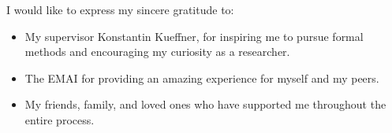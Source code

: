 
\begin{acknowledgement}


I would like to express my sincere gratitude to:

\begin{itemize}
 \item My supervisor Konstantin Kueffner, for inspiring me to pursue formal methods and encouraging my curiosity as a researcher. 
 \vspace*{3mm}
 \item The EMAI for providing an amazing experience for myself and my peers.
 \vspace*{3mm}
 \item My friends, family, and loved ones who have supported me throughout the entire process.
 \vspace*{3mm}
\end{itemize}

\newpage
\end{acknowledgement}